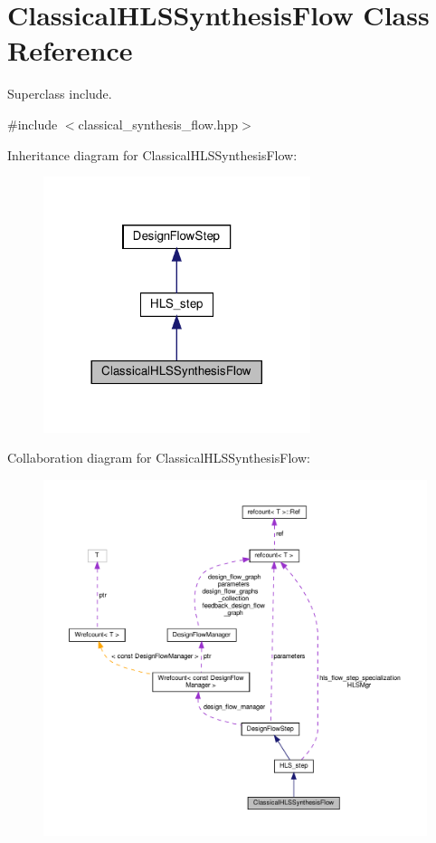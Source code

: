 \hypertarget{classClassicalHLSSynthesisFlow}{}\section{Classical\+H\+L\+S\+Synthesis\+Flow Class Reference}
\label{classClassicalHLSSynthesisFlow}


Superclass include.  




{\ttfamily \#include $<$classical\+\_\+synthesis\+\_\+flow.\+hpp$>$}



Inheritance diagram for Classical\+H\+L\+S\+Synthesis\+Flow\+:
\nopagebreak
\begin{figure}[H]
\begin{center}
\leavevmode
\includegraphics[width=221pt]{d1/da0/classClassicalHLSSynthesisFlow__inherit__graph}
\end{center}
\end{figure}


Collaboration diagram for Classical\+H\+L\+S\+Synthesis\+Flow\+:
\nopagebreak
\begin{figure}[H]
\begin{center}
\leavevmode
\includegraphics[width=350pt]{d7/d13/classClassicalHLSSynthesisFlow__coll__graph}
\end{center}
\end{figure}
